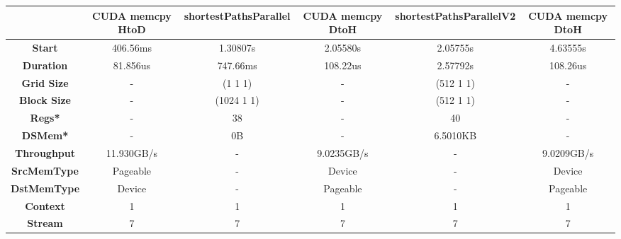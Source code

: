 \documentclass[
	a4paper, %
	12pt, %
]{class}
\begin{document}
\begin{center}
    \begin{adjustbox}{width=1\textwidth}
        \begin{tabular}{ |c|c|c|c|c|c| }
        \hline
        & \textbf{CUDA memcpy HtoD} & \textbf{shortestPathsParallel} & \textbf{CUDA memcpy DtoH} & \textbf{shortestPathsParallelV2} & \textbf{CUDA memcpy DtoH} \\ \hline
        \textbf{Start} & 406.56ms & 1.30807s & 2.05580s & 2.05755s & 4.63555s       \\ \hline
        \textbf{Duration} & 81.856us & 747.66ms & 108.22us & 2.57792s & 108.26us    \\ \hline
        \textbf{Grid Size} & - & (1 1 1) & - & (512 1 1) & - \\ \hline
        \textbf{Block Size} & - & (1024 1 1) & - & (512 1 1) & - \\ \hline
        \textbf{Regs*} & - & 38 & - & 40 & - \\ \hline
        \textbf{DSMem*} & - & 0B & - & 6.5010KB & -      \\ \hline
        \textbf{Throughput} & 11.930GB/s & - & 9.0235GB/s & - & 9.0209GB/s     \\ \hline
        \textbf{SrcMemType} & Pageable & - & Device & - & Device   \\ \hline
        \textbf{DstMemType} & Device & - & Pageable & - & Pageable   \\ \hline
        \textbf{Context} & 1 & 1 & 1 & 1 & 1    \\ \hline
        \textbf{Stream} & 7 & 7 & 7 & 7 & 7       \\ \hline
        \end{tabular}
    \end{adjustbox}
\end{center}
\end{document}
